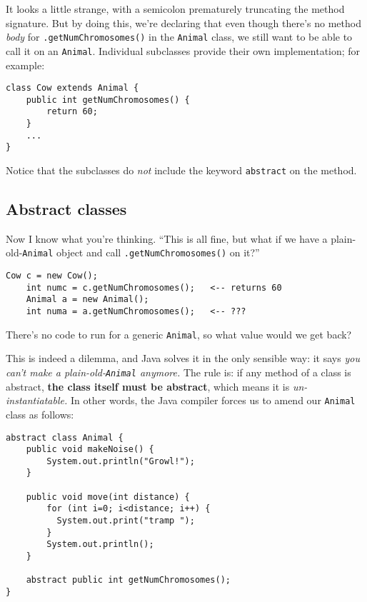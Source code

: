 \begin{samepage}
It looks a little strange, with a semicolon prematurely truncating the method
signature. But by doing this, we're declaring that even though there's no
method \textit{body} for \texttt{.getNumChromosomes()} in the \texttt{Animal}
class, we still want to be able to call it on an \texttt{Animal}. Individual 
subclasses provide their own implementation; for example:

\begin{Verbatim}[fontsize=\small,samepage=true,frame=single]
class Cow extends Animal {
    public int getNumChromosomes() {
        return 60;
    }
    ...
}
\end{Verbatim}
\end{samepage}

Notice that the subclasses do \textit{not} include the keyword \texttt{abstract}
on the method.

\subsection{Abstract classes}

\begin{samepage}
Now I know what you're thinking. ``This is all fine, but what if we have a
plain-old-\texttt{Animal} object and call \texttt{.getNumChromosomes()} on
it?'' 

\begin{Verbatim}[fontsize=\small,samepage=true,frame=single]
    Cow c = new Cow();
    int numc = c.getNumChromosomes();   <-- returns 60
    Animal a = new Animal();
    int numa = a.getNumChromosomes();   <-- ???
\end{Verbatim}

There's no code to run for a generic \texttt{Animal}, so what value would we
get back?
\end{samepage}

This is indeed a dilemma, and Java solves it in the only sensible way: it says
\textit{you can't make a plain-old-\texttt{Animal} anymore.} The rule is: if
any method of a class is abstract, \textbf{the class itself must be abstract},
which means it is \textit{un-instantiatable.} In other words, the Java
compiler forces us to amend our \texttt{Animal} class as follows:

\begin{Verbatim}[fontsize=\small,samepage=true,frame=single]
abstract class Animal {                         
    public void makeNoise() {            
        System.out.println("Growl!");      
    }                                    

    public void move(int distance) {     
        for (int i=0; i<distance; i++) {   
          System.out.print("tramp ");      
        }                                  
        System.out.println();              
    }

    abstract public int getNumChromosomes();
}                                      
\end{Verbatim}

